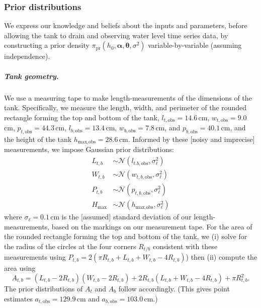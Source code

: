 \documentclass[openacc]{rsproca_new}%
\begin{document}
\subsubsection{Prior distributions} 
We express our knowledge and beliefs about the inputs and parameters, before allowing the tank to drain and observing water level time series data, by constructing a prior density $\pi_{\text{pr}}(h_0, \boldsymbol \alpha, \boldsymbol \theta, \sigma^2)$ variable-by-variable (assuming independence). 
\vspace{-\baselineskip}
\subparagraph{Tank geometry.} We use a measuring tape to make length-measurements of the dimensions of the tank.
Specifically, we measure the length, width, and perimeter of the rounded rectangle forming the top and bottom of the tank,
$l_{t, \text{obs}}=14.6$\,cm, $w_{t, \text{obs}}=9.0$\,cm, $p_{t, \text{obs}}=44.3$\,cm,
$l_{b, \text{obs}}=13.4$\,cm, $w_{b, \text{obs}}=7.8$\,cm, and $p_{b, \text{obs}}=40.1$\,cm, and the height of the tank $h_{\text{max}, \text{obs}}=28.6$\,cm.
Informed by these [noisy and imprecise] measurements, we impose Gaussian prior distributions:
\begin{align}
L_{t,b} &\sim \mathcal{N}(l_{t.b, \text{obs}}, \sigma_\ell^2) \\
W_{t,b} &\sim \mathcal{N}(w_{t,b, \text{obs}}, \sigma_\ell^2) \\
P_{t,b} &\sim \mathcal{N}(p_{t,b, \text{obs}}, \sigma_\ell^2) \\
H_{\text{max}} &\sim \mathcal{N}(h_{\text{max}, \text{obs}}, \sigma_\ell^2)
\end{align}
where $\sigma_\ell=0.1$\,cm is the [assumed] standard deviation of our length-measurements, based on the markings on our measurement tape. 
For the area of the rounded rectangle forming the top and bottom of the tank,
we (i) solve for the radius of the circles at the four corners $R_{t/b}$ consistent with these measurements using $P_{t,b}=2(\pi R_{t,b} + L_{t,b}+W_{t,b}-4R_{t,b})$) then (ii) compute the area \cite{rounded_rect} using
\begin{equation}
	A_{t,b}= (L_{t,b}-2R_{t,b})(W_{t,b}-2R_{t,b})+ 2R_{t,b} (L_{t,b}+W_{t,b} -4R_{t,b}) + \pi R_{t,b}^2.
\end{equation}
The prior distributions of $A_t$ and $A_b$ follow accordingly. 
(This gives point estimates $a_{t, \text{obs}}=129.9$\,cm and $a_{b, \text{obs}}=103.0$\,cm.)
\end{document}
